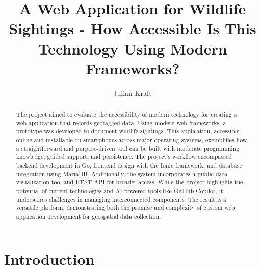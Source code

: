 \documentclass{josis}
\begin{document}

\title{A Web Application for Wildlife Sightings - How Accessible Is This Technology Using Modern Frameworks?}

\author{Julian Kraft}

\maketitle


\begin{abstract}

The project aimed to evaluate the accessibility of modern technology for creating a web application 
that records geotagged data. Using modern web frameworks, a prototype was developed to document wildlife sightings. 
This application, accessible online and installable on smartphones across major operating systems, 
exemplifies how a straightforward and purpose-driven tool can be built with moderate programming knowledge, 
guided support, and persistence. The project's workflow encompassed backend development in Go, 
frontend design with the Ionic framework, and database integration using MariaDB. Additionally, 
the system incorporates a public data visualization tool and REST API for broader access. 
While the project highlights the potential of current technologies and AI-powered tools like GitHub Copilot, 
it underscores challenges in managing interconnected components. The result is a versatile platform, 
demonstrating both the promise and complexity of custom web application development for geospatial data collection.

\end{abstract}

\section{Introduction}
\end{document}
